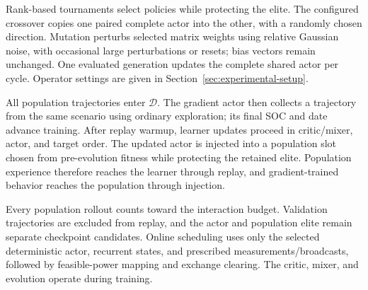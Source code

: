 Rank-based tournaments select policies while protecting the elite.
The configured crossover copies one paired complete actor into the other,
with a randomly chosen direction. Mutation perturbs selected matrix
weights using relative Gaussian noise, with occasional large perturbations
or resets; bias vectors remain unchanged. One evaluated generation updates
the complete shared actor per cycle. Operator settings are given in
Section~\ref{sec:experimental-setup}.

All population trajectories enter $\mathcal D$. The gradient actor then
collects a trajectory from the same scenario using ordinary exploration;
its final SOC and date advance training. After replay warmup, learner
updates proceed in critic/mixer, actor, and target order. The updated actor
is injected into a population slot chosen from pre-evolution fitness while
protecting the retained elite. Population experience therefore reaches the
learner through replay, and gradient-trained behavior reaches the population
through injection.

Every population rollout counts toward the interaction budget. Validation
trajectories are excluded from replay, and the actor and population elite
remain separate checkpoint candidates. Online scheduling uses only the
selected deterministic actor, recurrent states, and prescribed
measurements/broadcasts, followed by feasible-power mapping and exchange
clearing. The critic, mixer, and evolution operate during training.
